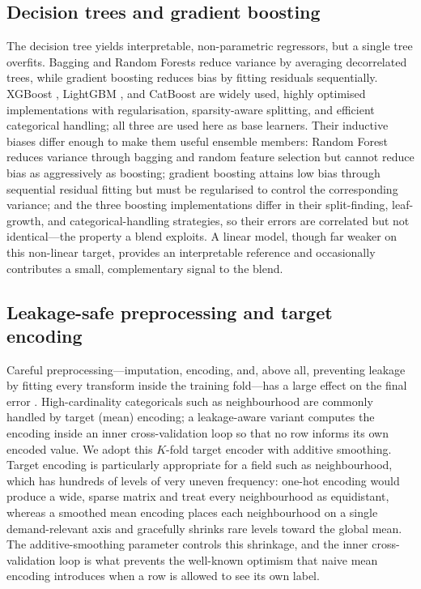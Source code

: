 \documentclass[journal]{IEEEtran}
\begin{document}
\subsection{Decision trees and gradient boosting}
The decision tree \cite{quinlan1986} yields interpretable, non-parametric
regressors, but a single tree overfits. Bagging \cite{breiman1996} and Random
Forests \cite{breiman2001} reduce variance by averaging decorrelated trees, while
gradient boosting \cite{friedman2001} reduces bias by fitting residuals
sequentially. XGBoost \cite{chen2016xgboost}, LightGBM \cite{ke2017lightgbm}, and
CatBoost \cite{prokhorenkova2018catboost} are widely used, highly optimised
implementations with regularisation, sparsity-aware splitting, and efficient
categorical handling; all three are used here as base learners. Their inductive biases differ enough to
make them useful ensemble members: Random Forest reduces variance through bagging
and random feature selection but cannot reduce bias as aggressively as boosting;
gradient boosting attains low bias through sequential residual fitting but must be
regularised to control the corresponding variance; and the three boosting
implementations differ in their split-finding, leaf-growth, and categorical-handling
strategies, so their errors are correlated but not identical---the property a blend
exploits. A linear model, though far weaker on this non-linear target, provides an
interpretable reference and occasionally contributes a small, complementary signal
to the blend.

\subsection{Leakage-safe preprocessing and target encoding}
Careful preprocessing---imputation, encoding, and, above all, preventing leakage
by fitting every transform inside the training fold---has a large effect on the
final error \cite{pedregosa2011sklearn}. High-cardinality categoricals such as
neighbourhood are commonly handled by target (mean) encoding; a leakage-aware
variant computes the encoding inside an inner cross-validation loop so that no row
informs its own encoded value. We adopt this $K$-fold target encoder with additive
smoothing. Target encoding is particularly appropriate for a field such as
neighbourhood, which has hundreds of levels of very uneven frequency: one-hot
encoding would produce a wide, sparse matrix and treat every neighbourhood as
equidistant, whereas a smoothed mean encoding places each neighbourhood on a single
demand-relevant axis and gracefully shrinks rare levels toward the global mean. The
additive-smoothing parameter controls this shrinkage, and the inner
cross-validation loop is what prevents the well-known optimism that naive mean
encoding introduces when a row is allowed to see its own label.
\end{document}
